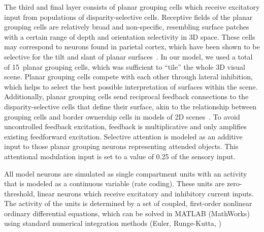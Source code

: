 The third and final layer consists of planar grouping cells which receive excitatory input from populations of disparity-selective
cells. Receptive fields of the planar grouping cells are relatively broad and non-specific, resembling surface patches with a certain range of depth and orientation selectivity in 3D space. These cells may correspond to neurons found in parietal cortex, which have been shown to be selective for the tilt and slant of planar surfaces~\cite{Rosenberg_etal13}. In our model, we used a total of 15~planar grouping cells, which was sufficient to ``tile'' the whole 3D visual scene. Planar grouping cells compete with each other through lateral inhibition, which helps to select the best possible interpretation of surfaces within the scene. Additionally, planar grouping cells send reciprocal feedback connections to the disparity-selective cells that define their surface, akin to the relationship between grouping cells and border ownership cells in
models of 2D scenes~\cite{Craft_etal07,Mihalas_etal11b}. To avoid
uncontrolled feedback excitation, feedback is multiplicative and only amplifies existing feedforward excitation. Selective attention is modeled as an additive input to those planar grouping neurons representing attended objects. This attentional modulation input is set to a value of 0.25 of the sensory input.

All model neurons are simulated as single compartment units with an
activity that is modeled as a continuous variable (rate coding). These
units are zero-threshold, linear neurons which receive excitatory and
inhibitory current inputs. The activity of the units is determined by
a set of coupled, first-order nonlinear ordinary differential equations, which can be solved in MATLAB (MathWorks) using standard numerical integration methods (Euler, Runge-Kutta, \etc) 

